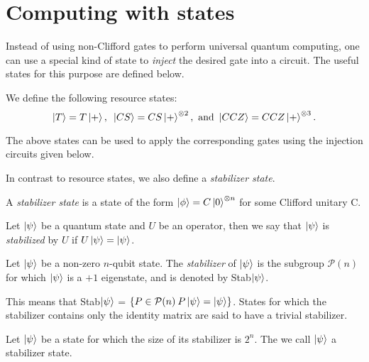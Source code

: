 \documentclass[12pt]{dalthesis}
\begin{document}
\section{Computing with states}
Instead of using non-Clifford gates to perform universal quantum computing, one can use a special kind of state to \emph{inject} the desired gate into a circuit. The useful states for this purpose are defined below.

\begin{definition}
We define the following resource states:
\begin{equation*}
\ket{T} = T\ket{+}, \mbox{ } \ket{CS} = CS \ket{+}^{\otimes 2}, \mbox{ and } \ket{CCZ} = CCZ \ket{+}^{\otimes 3}.
\end{equation*}
\end{definition}

The above states can be used to apply the corresponding gates using the injection circuits given below.




In contrast to resource states, we also define a \emph{stabilizer state}.

\begin{definition}
A \emph{stabilizer state} is a state of the form $\ket{\phi} = C \ket{0}^{\otimes n}$ for some Clifford unitary C. 
\end{definition}

\begin{definition}
Let $\ket{\psi}$ be a quantum state and $U$ be an operator, then we say that $\ket{\psi}$ is \emph{stabilized} by $U$ if $U\ket{\psi} = \ket{\psi}$. 
\end{definition}

\begin{definition}[Stabilizer]
Let $\ket{\psi}$ be a non-zero $n$-qubit state. The \emph{stabilizer} of $\ket{\psi}$ is the subgroup $\mathcal{P}(n)$ for which $\ket{\psi}$ is a $+1$ eigenstate, and is denoted by Stab$\ket{\psi}$. 
\end{definition}

This means that Stab$\ket{\psi}$ = $\{P \in \mathcal{P}(n) \: P \ket{\psi} = \ket{\psi} \}$. States for which the stabilizer contains only the identity matrix are said to have a trivial stabilizer. 

\begin{definition}
Let $\ket{\psi}$ be a state for which the size of its stabilizer is $2^n$. The we call $\ket{\psi}$ a stabilizer state.
\end{definition}
\end{document}
